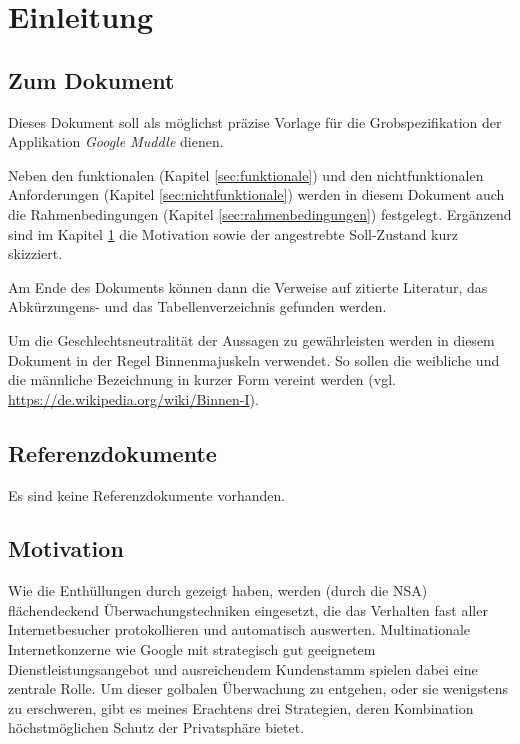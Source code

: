 \section{Einleitung}
\label{sec:einleitung}

\subsection{Zum Dokument}

Dieses Dokument soll als möglichst präzise Vorlage für die
Grobspezifikation der Applikation \textit{Google Muddle} dienen.

Neben den funktionalen (Kapitel \ref{sec:funktionale}) und den nichtfunktionalen
Anforderungen (Kapitel \ref{sec:nichtfunktionale}) werden in diesem Dokument
auch die Rahmenbedingungen (Kapitel \ref{sec:rahmenbedingungen}) festgelegt.
Ergänzend sind im Kapitel \ref{sec:einleitung} die Motivation sowie der
angestrebte Soll-Zustand kurz skizziert.

Am Ende des Dokuments können dann die Verweise auf zitierte Literatur, das
Abkürzungens- und das Tabellenverzeichnis gefunden werden.

Um die Geschlechtsneutralität der Aussagen zu gewährleisten werden in diesem
Dokument in der Regel Binnenmajuskeln verwendet. So sollen die weibliche und
die männliche Bezeichnung in kurzer Form vereint werden (vgl.
\url{https://de.wikipedia.org/wiki/Binnen-I}).

\subsection{Referenzdokumente}

Es sind keine Referenzdokumente vorhanden.

\subsection{Motivation}
\label{subsec:einleitun-motivation}

Wie die Enthüllungen durch \cite{snowden:nsa} gezeigt haben, werden (durch die
\acs{NSA}) flächendeckend Überwachungstechniken eingesetzt, die das Verhalten
fast aller Internetbesucher protokollieren und automatisch auswerten.
Multinationale Internetkonzerne wie Google mit strategisch gut geeignetem
Dienstleistungsangebot und ausreichendem Kundenstamm spielen dabei eine zentrale
Rolle. Um dieser golbalen Überwachung zu entgehen, oder sie wenigstens zu
erschweren, gibt es meines Erachtens drei Strategien, deren Kombination
höchstmöglichen Schutz der Privatsphäre bietet.

